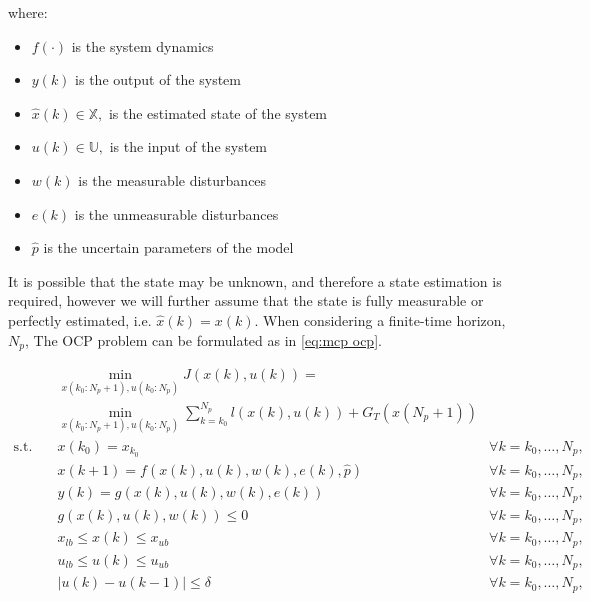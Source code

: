 where:
\begin{itemize}
	\item $f(\cdot)$ is the system dynamics
	\item $y(k)$ is the output of the system
	\item $\hat x(k) \in \mathbb X,$ is the estimated state of the system 
	\item $u(k) \in \mathbb U,$ is the input of the system
	\item $w(k)$ is the measurable disturbances 
	\item $e(k)$ is the unmeasurable disturbances 
	\item $\hat p$ is the uncertain parameters of the model
\end{itemize}

It is possible that the state may be unknown, and therefore a state estimation is required, however we will further assume that the state is fully measurable or perfectly estimated, i.e. $\hat x(k) = x(k)$.
When considering a finite-time horizon, $N_p$, The OCP problem can be formulated as in \autoref{eq:mcp ocp}.

\begin{equation}
	\begin{aligned}
		& \min_{x(k_0:N_p+1),u(k_0:N_p)} J(x(k),u(k)) = \\ 
		& \min_{x(k_0:N_p+1),u(k_0:N_p)} \sum_{k=k_0}^{N_p} l(x(k),u(k)) + G_T(x(N_p +1))  \\
		\text{s.t.} \quad  & x(k_0) = x_{k_0}                              & \forall k = k_0,\hdots, N_p,\\
		& x(k+1) = f(x(k),u(k),w(k),e(k), \hat p)       & \forall k = k_0,\hdots, N_p,\\
		& y(k) = g(x(k),u(k),w(k),e(k))                 & \forall k = k_0,\hdots, N_p,\\
		& g(x(k),u(k),w(k)) \leq 0                      & \forall k = k_0,\hdots, N_p,\\
		& x_{lb} \leq x(k) \leq x_{ub}                  & \forall k = k_0,\hdots, N_p,\\
		& u_{lb} \leq u(k) \leq u_{ub}                  & \forall k = k_0,\hdots, N_p,\\
		& |u(k) - u(k-1)| \leq \delta                   & \forall k = k_0,\hdots, N_p,\\
	\end{aligned}
	\label{eq:mcp ocp}
\end{equation}

